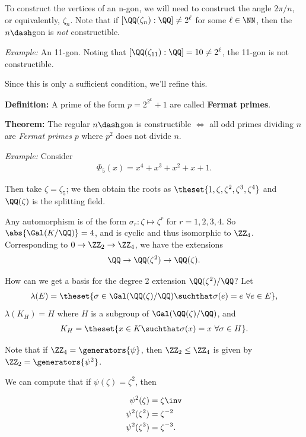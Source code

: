 To construct the vertices of an n-gon, we will need to construct the
angle \(2\pi/n\), or equivalently, \(\zeta_n\). Note that if
\([\QQ(\zeta_n) : \QQ] \neq 2^\ell\) for some \(\ell\in\NN\), then the
\(n\dash\)gon is \emph{not} constructible.

\emph{Example:} An 11-gon. Noting that
\([\QQ(\zeta_{11}) : \QQ] = 10 \neq 2^\ell\), the 11-gon is not
constructible.

Since this is only a sufficient condition, we'll refine this.

\textbf{Definition:} A prime of the form \(p = 2^{2^k}+1\) are called
\textbf{Fermat primes}.

\textbf{Theorem:} The regular \(n\dash\)gon is constructible \(\iff\)
all odd primes dividing \(n\) are \emph{Fermat primes} \(p\) where
\(p^2\) does not divide \(n\).

\emph{Example:} Consider
\begin{align*}
\Phi_5(x) = x^4 + x^3 + x^2 + x + 1
.\end{align*}

Then take \(\zeta = \zeta_5\); we then obtain the roots as
\(\theset{1, \zeta, \zeta^2, \zeta^3, \zeta^4}\) and \(\QQ(\zeta)\) is
the splitting field.

Any automorphism is of the form \(\sigma_r: \zeta \mapsto \zeta^r\) for
\(r=1,2,3,4\). So \(\abs{\Gal(K/\QQ)} = 4\), and is cyclic and thus
isomorphic to \(\ZZ_4\). Corresponding to \(0 \to \ZZ_2 \to \ZZ_4\), we
have the extensions
\begin{align*}
\QQ \to \QQ(\zeta^2) \to \QQ(\zeta)
.\end{align*}

How can we get a basis for the degree 2 extension \(\QQ(\zeta^2)/\QQ\)?
Let
\begin{align*}
\lambda(E) = \theset{\sigma \in \Gal(\QQ(\zeta)/\QQ) \suchthat \sigma(e) = e ~\forall e\in E }
,\end{align*} \(\lambda(K_H) = H\) where \(H\) is a subgroup of
\(\Gal(\QQ(\zeta)/\QQ)\), and
\begin{align*}
K_H = \theset{x\in K \suchthat \sigma(x) = x ~\forall \sigma\in H}
.\end{align*}

Note that if \(\ZZ_4 = \generators{\psi}\), then \(\ZZ_2 \leq \ZZ_4\) is
given by \(\ZZ_2 = \generators{\psi^2}\).

We can compute that if \(\psi(\zeta) = \zeta^2\), then

\begin{align*}
\psi^2(\zeta) &= \zeta\inv \\
\psi^2(\zeta^2) &= \zeta^{-2}\\
\psi^2(\zeta^3) &= \zeta^{-3}
.\end{align*}


